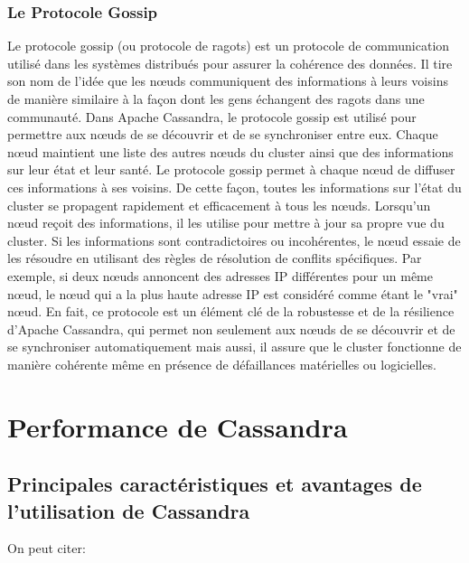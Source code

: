 \documentclass[12pt, letterpaper]{report}
\begin{document}
\subsection{Le Protocole Gossip}
Le protocole gossip (ou protocole de ragots) est un protocole de communication utilisé dans les systèmes distribués pour assurer la cohérence des données. Il tire son nom de l'idée que les nœuds communiquent des informations à leurs voisins de manière similaire à la façon dont les gens échangent des ragots dans une communauté.
\newline
Dans Apache Cassandra, le protocole gossip est utilisé pour permettre aux nœuds de se découvrir et de se synchroniser entre eux. Chaque nœud maintient une liste des autres nœuds du cluster ainsi que des informations sur leur état et leur santé. Le protocole gossip permet à chaque nœud de diffuser ces informations à ses voisins. De cette façon, toutes les informations sur l'état du cluster se propagent rapidement et efficacement à tous les nœuds.
\newline
Lorsqu'un nœud reçoit des informations, il les utilise pour mettre à jour sa propre vue du cluster. Si les informations sont contradictoires ou incohérentes, le nœud essaie de les résoudre en utilisant des règles de résolution de conflits spécifiques. Par exemple, si deux nœuds annoncent des adresses IP différentes pour un même nœud, le nœud qui a la plus haute adresse IP est considéré comme étant le "vrai" nœud.
\newline
En fait, ce protocole est un élément clé de la robustesse et de la résilience d’Apache Cassandra, qui permet non seulement aux nœuds de se découvrir et de se synchroniser automatiquement mais aussi, il assure que le cluster fonctionne de manière cohérente même en présence de défaillances matérielles ou logicielles.

\chapter{Performance de Cassandra}
\section{Principales caractéristiques et avantages de l'utilisation de Cassandra}
On peut citer:
\end{document}
